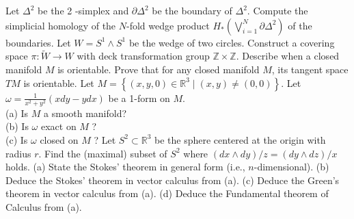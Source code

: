\documentclass[10pt]{article}
\begin{document}
\newpage
Let $\Delta^{2}$ be the 2 -simplex and $\partial \Delta^{2}$ be the boundary of $\Delta^{2}$. Compute the simplicial homology of the $N$-fold wedge product $H_{*}\left(\bigvee_{i=1}^{N} \partial \Delta^{2}\right)$ of the boundaries.
\newpage
Let $W=S^{1} \wedge S^{1}$ be the wedge of two circles. Construct a covering space $\pi: \tilde{W} \rightarrow W$ with deck transformation group $\mathbb{Z} \times \mathbb{Z}$.
\newpage
Describe when a closed manifold $M$ is orientable. Prove that for any closed manifold $M$, its tangent space $T M$ is orientable.
\newpage
Let $M=\left\{(x, y, 0) \in \mathbb{R}^{3} \mid(x, y) \neq(0,0)\right\}$. Let $\omega=\frac{1}{x^{2}+y^{2}}(x d y-y d x)$ be a 1-form on $M$.\\
(a) Is $M$ a smooth manifold?\\
(b) Is $\omega$ exact on $M$ ?\\
(c) Is $\omega$ closed on $M$ ?
\newpage
Let $S^{2} \subset \mathbb{R}^{3}$ be the sphere centered at the origin with radius $r$. Find the (maximal) subset of $S^{2}$ where $(d x \wedge d y) / z=(d y \wedge d z) / x$ holds.
(a) State the Stokes' theorem in general form (i.e., $n$-dimensional).
(b) Deduce the Stokes' theorem in vector calculus from (a).
(c) Deduce the Green's theorem in vector calculus from (a).
(d) Deduce the Fundamental theorem of Calculus from (a).
\newpage
\end{document}
